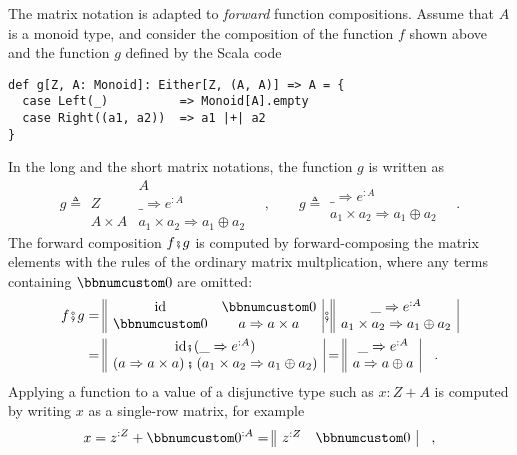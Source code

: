 The matrix notation is adapted to \emph{forward} function compositions.
Assume that $A$ is a monoid type, and consider the composition of
the function $f$ shown above and the function $g$ defined by the
Scala code
\begin{lstlisting}
def g[Z, A: Monoid]: Either[Z, (A, A)] => A = {
  case Left(_)          => Monoid[A].empty
  case Right((a1, a2))  => a1 |+| a2
}
\end{lstlisting}
In the long and the short matrix notations, the function $g$ is written
as
\[
g\triangleq\begin{array}{|c||c|}
 & A\\
\hline Z & \_\Rightarrow e^{:A}\\
A\times A & a_{1}\times a_{2}\Rightarrow a_{1}\oplus a_{2}
\end{array}\quad,\quad\quad g\triangleq\begin{array}{||c|}
\_\Rightarrow e^{:A}\\
a_{1}\times a_{2}\Rightarrow a_{1}\oplus a_{2}
\end{array}\quad.
\]
The forward composition $f\bef g$ is computed by forward-composing
the matrix elements with the rules of the ordinary matrix multplication,
where any terms containing $\bbnum 0$ are omitted:
\begin{align*}
f\bef g & =\begin{array}{||cc|}
\text{id} & \bbnum 0\\
\bbnum 0 & a\Rightarrow a\times a
\end{array}\bef\begin{array}{||c|}
\_\Rightarrow e^{:A}\\
a_{1}\times a_{2}\Rightarrow a_{1}\oplus a_{2}
\end{array}\\
 & =\begin{array}{||c|}
\text{id}\bef(\_\Rightarrow e^{:A})\\
\left(a\Rightarrow a\times a\right)\bef\left(a_{1}\times a_{2}\Rightarrow a_{1}\oplus a_{2}\right)
\end{array}=\begin{array}{||c|}
\_\Rightarrow e^{:A}\\
a\Rightarrow a\oplus a
\end{array}\quad.
\end{align*}
Applying a function to a value of a disjunctive type such as $x:Z+A$
is computed by writing $x$ as a single-row matrix, for example
\[
x=z^{:Z}+\bbnum 0^{:A}=\begin{array}{||cc|}
z^{:Z} & \bbnum 0\end{array}\quad,
\]
